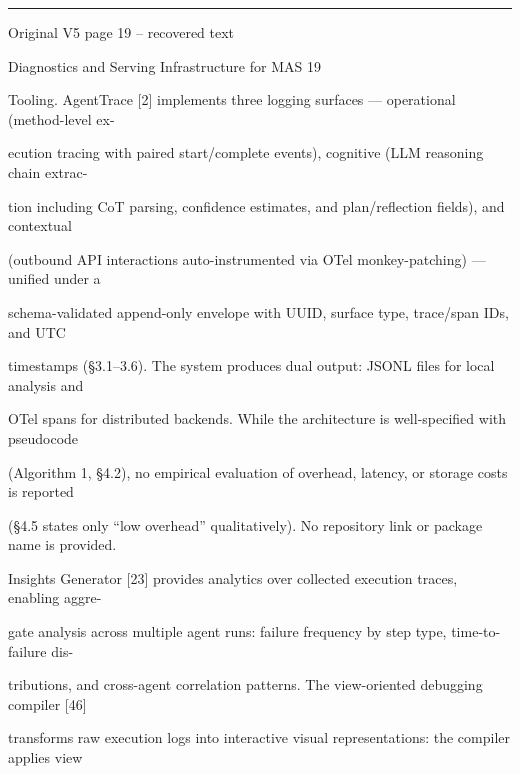 \par\smallskip\noindent\rule{\textwidth}{0.4pt}\par{\sffamily\footnotesize Original V5 page 19 -- recovered text}\par\begin{flushleft}\footnotesize\ttfamily
\par\smallskip
\par\smallskip
\noindent Diagnostics and Serving Infrastructure for MAS 19\par
\par\smallskip
\par\smallskip
\par\smallskip
\noindent Tooling. AgentTrace [2] implements three logging surfaces — operational (method-level ex-\par
\noindent ecution tracing with paired start/complete events), cognitive (LLM reasoning chain extrac-\par
\noindent tion including CoT parsing, confidence estimates, and plan/reflection fields), and contextual\par
\noindent (outbound API interactions auto-instrumented via OTel monkey-patching) — unified under a\par
\noindent schema-validated append-only envelope with UUID, surface type, trace/span IDs, and UTC\par
\noindent timestamps (§3.1–3.6). The system produces dual output: JSONL files for local analysis and\par
\noindent OTel spans for distributed backends. While the architecture is well-specified with pseudocode\par
\noindent (Algorithm 1, §4.2), no empirical evaluation of overhead, latency, or storage costs is reported\par
\noindent (§4.5 states only “low overhead” qualitatively). No repository link or package name is provided.\par
\noindent  Insights Generator [23] provides analytics over collected execution traces, enabling aggre-\par
\noindent gate analysis across multiple agent runs: failure frequency by step type, time-to-failure dis-\par
\noindent tributions, and cross-agent correlation patterns. The view-oriented debugging compiler [46]\par
\noindent transforms raw execution logs into interactive visual representations: the compiler applies view\par

\end{flushleft}
